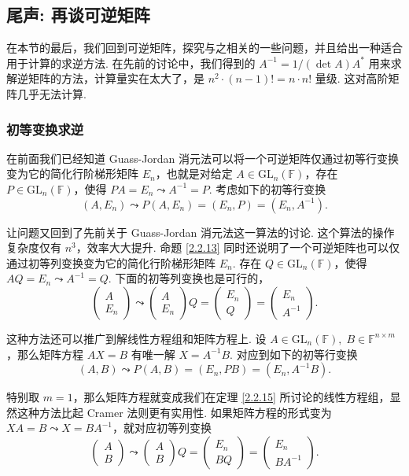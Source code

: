 \documentclass[10pt,openany]{article}
\theoremstyle{thmstyle} %
\theoremstyle{defstyle} %
\theoremstyle{prostyle} %
\theoremstyle{exastyle}
\theoremstyle{remstyle}
\newcommand{\F}{\mathbb{F}}
\newcommand{\gfn}{\text{GL}_n(\mathbb{F})}
\newcommand{\nm}{^{n \times m}}
\begin{document}
\subsection{尾声: 再谈可逆矩阵}

在本节的最后，我们回到可逆矩阵，探究与之相关的一些问题，并且给出一种适合用于计算的求逆方法. 在先前的讨论中，我们得到的 \( A^{-1}= 1/(\det A) A^* \) 用来求解逆矩阵的方法，计算量实在太大了，是 \( n^2 \cdot (n-1)!=n \cdot n! \) 量级. 这对高阶矩阵几乎无法计算.

\subsubsection{初等变换求逆}

在前面我们已经知道 Guass-Jordan 消元法可以将一个可逆矩阵仅通过初等行变换变为它的简化行阶梯形矩阵 \( E_n \)，也就是对给定 \( A \in \gfn \)，存在 \(  P \in \gfn \)，使得 \( PA=E_n \leadsto A^{-1}=P \). 考虑如下的初等行变换
\[ (A,E_n) \leadsto P(A,E_n)=(E_n,P)=(E_n,A^{-1}). \]

让问题又回到了先前关于  Guass-Jordan 消元法这一算法的讨论. 这个算法的操作复杂度仅有 \( n^3 \)，效率大大提升. 命题 \ref{2.2.13} 同时还说明了一个可逆矩阵也可以仅通过初等列变换变为它的简化行阶梯形矩阵 \( E_n \). 存在 \( Q \in \gfn \)，使得 \( AQ=E_n \leadsto A^{-1}=Q \). 下面的初等列变换也是可行的，
\[ \begin{pmatrix}
	A \\ E_n
\end{pmatrix} \leadsto \begin{pmatrix}
A \\ E_n
\end{pmatrix}Q=\begin{pmatrix}
E_n \\ Q
\end{pmatrix}=\begin{pmatrix}
E_n \\ A^{-1}
\end{pmatrix}. \]

这种方法还可以推广到解线性方程组和矩阵方程上. 设 \( A \in \gfn, \; B \in \F\nm \)，那么矩阵方程 \( AX=B \) 有唯一解 \( X=A^{-1}B \). 对应到如下的初等行变换
\[ (A,B) \leadsto P(A,B)=(E_n,PB)=(E_n,A^{-1}B). \]

特别取 \( m=1 \)，那么矩阵方程就变成我们在定理 \ref{2.2.15} 所讨论的线性方程组，显然这种方法比起 Cramer 法则更有实用性. 如果矩阵方程的形式变为 \( XA=B \leadsto X=BA^{-1} \)，就对应初等列变换 
\[ \begin{pmatrix}
	A \\ B
\end{pmatrix} \leadsto \begin{pmatrix}
A \\ B
\end{pmatrix}Q=\begin{pmatrix}
	E_n \\ BQ
\end{pmatrix}=\begin{pmatrix}
	E_n \\ BA^{-1}
\end{pmatrix}. \]
\end{document}
